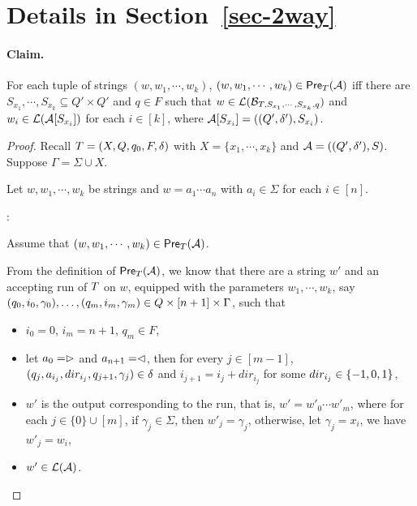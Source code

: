 \section{Details in Section~\ref{sec-2way}} \label{appendix:sec-2way}

\paragraph{Claim.} For each tuple of strings $(w, w_1,\cdots, w_k)$, $(w, w_1,\cdots, w_k) \in \textsf{Pre}_{T}(\mathcal{A})$ iff there are $S_{x_1}, \cdots, S_{x_k} \subseteq Q' \times Q'$ and $q \in F$ such that $w \in \mathcal{L}(\mathcal{B}_{T, S_{x_1}, \cdots, S_{x_k}, q})$ and $w_i \in \mathcal{L}(\mathcal{A}[S_{x_i}])$ for each $i \in [k]$, where $\mathcal{A}[S_{x_i}]=((Q', \delta'), S_{x_i})$.

\begin{proof}
Recall $T = (X, Q, q_0, F, \delta)$ with $X= \{x_1,\cdots, x_k\}$ and $\mathcal{A} =( (Q', \delta'), S)$. 
Suppose $\Gamma = \Sigma \cup X$. 

Let $w, w_1, \cdots, w_k$ be strings and $w = a_1 \cdots a_n$ with $a_i \in \Sigma$ for each $i \in [n]$.

\smallskip

: 

\smallskip

Assume that $(w, w_1,\cdots, w_k) \in \textsf{Pre}_{T}(\mathcal{A})$.


From the definition of $\textsf{Pre}_{T}(\mathcal{A})$, we know that there are a string $w' $ and an accepting run of $T$ on $w$, equipped with the parameters $w_1,\cdots, w_k$, say $(q_0, i_0, \gamma_0),\ldots, (q_m, i_m, \gamma_m) \in Q \times [n+1] \times \Gamma$, such that 
%
\begin{itemize}
\item $i_0=0$, $i_m = n+1$, $q_m \in F$,
%
\item let $a_0 = \vartriangleright$ and $a_{n+1} = \vartriangleleft$,  then for every $j \in [m-1]$, $(q_j, a_{i_j}, dir_{i_j}, q_{j+1}, \gamma_j) \in
        \delta$ and $i_{j+1} = i_j + dir_{i_j}$ for some $dir_{i_j} \in \{-1, 0, 1\}$, 
 \item $w'$ is the output corresponding to the run, that is, $ w' = w'_0 \cdots w'_m$, where for each $j \in \{0\} \cup [m]$, if $\gamma_j \in \Sigma$, then $w'_j = \gamma_j$, otherwise, let $\gamma_j = x_i$, we have $w'_j = w_i$,
 \item  $w' \in \mathcal{L}(\mathcal{A})$.
\end{itemize}


\end{proof}
